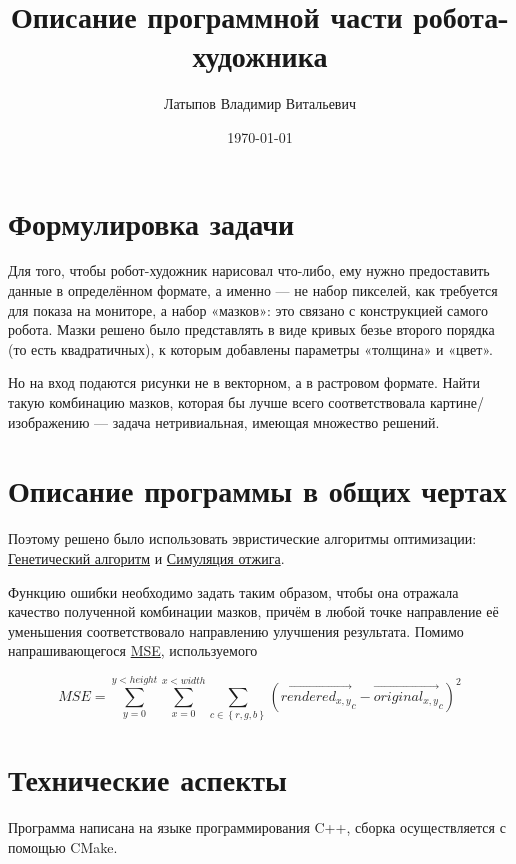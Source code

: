 \documentclass[11pt]{article}
\title{Описание программной части робота-художника}
\author{Латыпов Владимир Витальевич}
\date{\today}
\begin{document}
    \maketitle
    \newpage


    \section{Формулировка задачи}

    Для того, чтобы робот-художник нарисовал что-либо, ему нужно предоставить данные в определённом формате, а именно — не набор пикселей,
    как требуется для показа на мониторе, а набор «мазков»: это связано с конструкцией самого робота.
    Мазки решено было представлять в виде кривых безье второго порядка (то есть квадратичных), к которым добавлены параметры «толщина» и «цвет».

    Но на вход подаются рисунки не в векторном, а в растровом формате.
    Найти такую комбинацию мазков, которая бы лучше всего соответствовала картине/изображению — задача нетривиальная, имеющая множество решений.

    \section{Описание программы в общих чертах}\label{sec:approx_description}
    Поэтому решено было использовать эвристические алгоритмы оптимизации:
    \href{https://en.wikipedia.org/wiki/Simulated_annealing}{Генетический алгоритм} и \href{https://en.wikipedia.org/wiki/Simulated_annealing}{Симуляция отжига}.

    Функцию ошибки необходимо задать таким образом, чтобы она отражала качество полученной комбинации мазков,
    причём в любой точке направление её уменьшения соответствовало направлению улучшения результата.
    Помимо напрашивающегося \href{https://en.wikipedia.org/wiki/Mean_squared_error}{MSE}, используемого

    \begin{equation}\label{eq:equation}
        MSE = \sum_{y = 0}^{y < height} { \sum_{x = 0}^{x < width} { \sum_{c \in  \left\{ r, g, b \right\} } { \left( {\overrightarrow {rendered_{x, y}}}_c - {\overrightarrow{original_{x, y}}}_c\right)^2 }}}
    \end{equation}


    \section{Технические аспекты}
    Программа написана на языке программирования C++, сборка осуществляется с помощью CMake.
\end{document}
